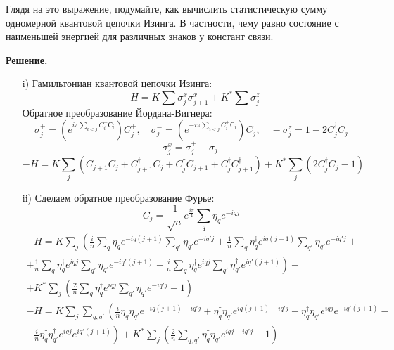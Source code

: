 \documentclass[12pt]{article}
\theoremstyle{definition}
\begin{document}
\begin{enumerate}
\begin{itemize}
\begin{equation}
        \end{equation}
        Глядя на это выражение, подумайте, как вычислить статистическую сумму одномерной квантовой цепочки Изинга. В частности, чему равно состояние с наименьшей энергией для различных знаков у констант связи.
    \end{itemize}
    \textbf{Решение.}
    \begin{itemize}
        \item[i)] Гамильтониан квантовой цепочки Изинга:
        \begin{equation}
            -H=K\sum\sigma^x_j\sigma^x_{j+1}+K^*\sum\sigma^z_j
        \end{equation} 
        Обратное преобразование Йордана-Вигнера:
        \begin{equation}
            \sigma^+_j=\left(e^{i\pi\sum\limits_{i<j}C_i^+С_i}\right)C^+_j,\quad\sigma_j^-=\left(e^{-i\pi\sum\limits_{i<j}C_i^+С_i}\right)C_j,\quad-\sigma_j^z=1-2C^\dagger_jC_j
        \end{equation}
        \begin{equation}
            \sigma^x_j=\sigma^+_j+\sigma^-_j
        \end{equation}
        \begin{equation}
            -H=K\sum\limits_j(C_{j+1}C_j+C^\dagger_{j+1}C_j+C^\dagger_jC_{j+1}+C^\dagger_jC^\dagger_{j+1})+K^*\sum\limits_j(2C^\dagger_jC_j-1)
        \end{equation}
        \item[ii)] Сделаем обратное преобразование Фурье:
        \begin{equation}
            C_j=\frac{1}{\sqrt{n}}e^{\frac{i\pi}{4}}\sum\limits_q \eta_qe^{-iqj}
        \end{equation}
        \begin{multline}
            -H=K\sum\limits_j\left(\frac{i}{n}\sum\limits_q \eta_qe^{-iq(j+1)}\sum\limits_{q'} \eta_{q'}e^{-iq'j}+\frac{1}{n}\sum\limits_q \eta^\dagger_qe^{iq(j+1)}\sum\limits_{q'} \eta_{q'}e^{-iq'j}+\right.\\\left.+\frac{1}{n}\sum\limits_q \eta^\dagger_qe^{iqj}\sum\limits_{q'} \eta_{q'}e^{-iq'(j+1)}-\frac{i}{n}\sum\limits_q \eta^\dagger_qe^{iqj}\sum\limits_{q'} \eta^\dagger_{q'}e^{iq'(j+1)}\right)+\\+K^*\sum\limits_j\left(\frac{2}{n}\sum\limits_q \eta^\dagger_qe^{iqj}\sum\limits_{q'} \eta_{q'}e^{-iq'j}-1\right)
        \end{multline}
        \begin{multline}
            -H=K\sum\limits_j\sum\limits_{q,q'}\left(\frac{i}{n}\eta_q\eta_{q'}e^{-iq(j+1)-iq'j}+ \eta^\dagger_q\eta_{q'}e^{iq(j+1)-iq'j}+\eta^\dagger_q\eta_{q'}e^{iqj}e^{-iq'(j+1)}-\right.\\\left.-\frac{i}{n}\eta^\dagger_q\eta^\dagger_{q'}e^{iqj} e^{iq'(j+1)}\right)+K^*\sum\limits_j\left(\frac{2}{n}\sum\limits_{q,q'}\eta^\dagger_q\eta_{q'}e^{iqj-iq'j}-1\right)

\end{multline}
\end{itemize}
\end{enumerate}
\end{document}
